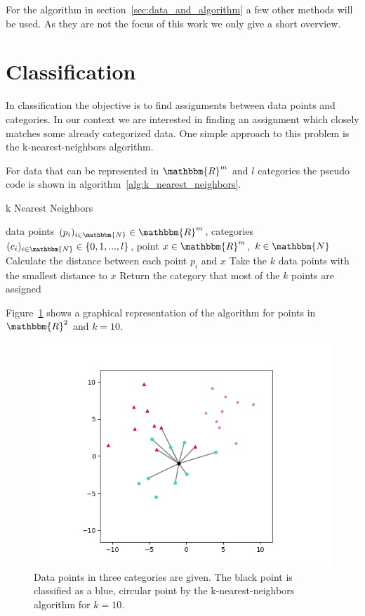 For the algorithm in section~\ref{sec:data_and_algorithm} a few other methods will be used. As they are not the focus of this work we only give a short overview.

\section{Classification}
\label{subsec:classification}

In classification the objective is to find assignments between data points and categories. In our context we are interested in finding an assignment which closely matches some already categorized data. One simple approach to this problem is the k-nearest-neighbors algorithm.

For data that can be represented in $\mathbbm{R}^m$ and $l$ categories the pseudo code is shown in algorithm~\ref{alg:k_nearest_neighbors}.

\begin{algorithm}
	\caption{k Nearest Neighbors}\label{alg:k_nearest_neighbors}
	\begin{algorithmic}
		\Require data points $(p_i)_{i \in \mathbbm{N}} \in \mathbbm{R}^{m}$, categories $(c_i)_{i \in \mathbbm{N}} \in \{0, 1, ..., l\}$, point $x \in \mathbbm{R}^{m}$, $k \in \mathbbm{N}$
		\State Calculate the distance between each point $p_i$ and $x$
		\State Take the $k$ data points with the smallest distance to $x$
		\State Return the category that most of the $k$ points are assigned
	\end{algorithmic}
\end{algorithm}

Figure~\ref{fig:k_nearest_neighbors} shows a graphical representation of the algorithm for points in $\mathbbm{R}^2$ and $k=10$.

\begin{figure}
	\centering
	\includegraphics[width=\linewidth]{figs/k_nearest_neighbors}
	\caption{Data points in three categories are given. The black point is classified as a blue, circular point by the k-nearest-neighbors algorithm for $k=10$.}
	\label{fig:k_nearest_neighbors}
\end{figure}

